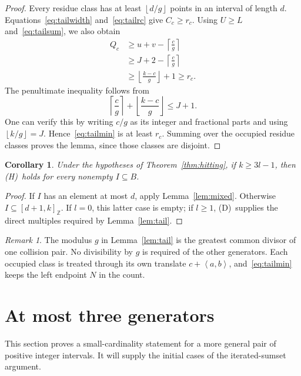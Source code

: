 \documentclass[11pt,a4paper]{article}
\numberwithin{equation}{section}
\newtheorem{corollary}[theorem]{Corollary}
\theoremstyle{remark}
\newtheorem{remark}[theorem]{Remark}
\newcommand{\Z}{\mathbb Z}
\newcommand{\sg}[1]{\left\langle #1\right\rangle}
\newcommand{\floor}[1]{\left\lfloor #1\right\rfloor}
\newcommand{\ceil}[1]{\left\lceil #1\right\rceil}
\newcommand{\Dcond}{\textup{(D)}}
\newcommand{\Hcond}{\textup{(H)}}
\newcommand{\interval}[2]{[#1,#2]_{\Z}}
\begin{document}
\begin{proof}
Every residue class has at least $\floor{d/g}$ points in an interval
of length $d$. Equations~\eqref{eq:tailwidth} and~\eqref{eq:tailrc}
give $C_c\ge r_c$.
Using $U\ge L$ and~\eqref{eq:tailsum}, we also obtain
\begin{equation}\label{eq:tailQbound}
  \begin{split}
  Q_c
  &\ge u+v-\ceil{\frac{c}{g}}\\
  &\ge J+2-\ceil{\frac{c}{g}}\\
  &\ge \floor{\frac{k-c}{g}}+1
   \ge r_c.
  \end{split}
\end{equation}
The penultimate inequality follows from
\[
  \ceil{\frac{c}{g}}+\floor{\frac{k-c}{g}}\le J+1.
\]
One can verify this by writing $c/g$ as its integer and fractional
parts and using $\floor{k/g}=J$.
Hence~\eqref{eq:tailmin} is at least $r_c$.
Summing over the occupied residue classes proves the lemma, since those
classes are disjoint.
\end{proof}

\begin{corollary}\label{cor:tailrange}
Under the hypotheses of Theorem~\ref{thm:hitting}, if $k\ge3l-1$,
then \Hcond\ holds for every nonempty $I\subseteq B$.
\end{corollary}

\begin{proof}
If $I$ has an element at most $d$, apply Lemma~\ref{lem:mixed}.
Otherwise $I\subseteq\interval{d+1}{k}$.
If $l=0$, this latter case is empty; if $l\ge1$, \Dcond\ supplies the
direct multiples required by Lemma~\ref{lem:tail}.
\end{proof}

\begin{remark}
The modulus $g$ in Lemma~\ref{lem:tail} is the greatest common divisor
of one collision pair. No divisibility by $g$ is required of the other
generators. Each occupied class is treated through its own translate
$c+\sg{a,b}$, and~\eqref{eq:tailmin} keeps the left endpoint $N$
in the count.
\end{remark}

\section{At most three generators}\label{sec:three}

This section proves a small-cardinality statement for a more general
pair of positive integer intervals. It will supply the initial cases
of the iterated-sumset argument.
\end{document}
